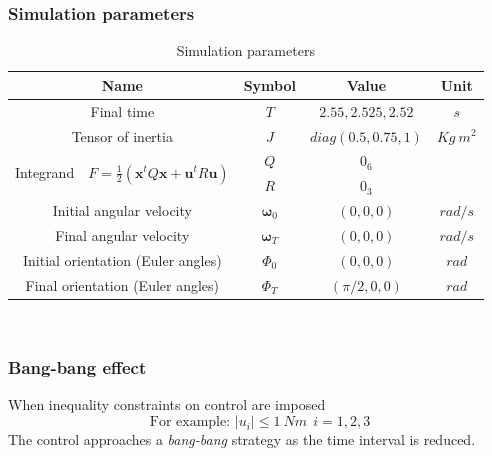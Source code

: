 \documentclass{beamer}
\begin{document}
\begin{frame} \frametitle{Simulation parameters}
	\pause
	{\tiny
		\begin{table}
			\centering
			\begin{tabular}{cccc}
				\toprule
				\textbf{Name} & \textbf{Symbol} & \textbf{Value} & \textbf{Unit} \\
				\midrule
				Final time & $T$ & $2.55, 2.525, 2.52$ & $s$ \\
				Tensor of inertia & $J$ & $diag(0.5, 0.75, 1)$ & $Kg\ m^2$ \\
				\multirow{2}{*}{ Integrand\ \
					$F = \frac{1}{2}( \bm{x}^tQ\bm{x} + \bm{u}^tR\bm{u})$ } & $Q$ & $0_6$ & \\
				& $R$ & $0_3$ & \\
				Initial angular velocity & $\bm{\omega}_0$ & $(0,0,0)$ & $rad/s$ \\
				Final angular velocity & $\bm{\omega}_T$ & $(0,0,0)$ & $rad/s$ \\
				Initial orientation (Euler angles) & $\Phi_0$ & $(0,0,0)$ & $rad$ \\
				Final orientation (Euler angles) & $\Phi_T$ & $(\pi/2,0,0)$ & $rad$ \\
				\bottomrule
			\end{tabular}
			\caption{Simulation parameters}
		\end{table}
	}
\end{frame}

\begin{frame} \frametitle{Bang-bang effect}
	\pause
	When inequality constraints on control are imposed
	\pause
	$$\text{For example: } |u_i| \leq 1\ Nm\ \ i=1,2,3$$
	\pause
	The control approaches a \textit{bang-bang} strategy as the time interval is reduced.	
\end{frame}
\end{document}
